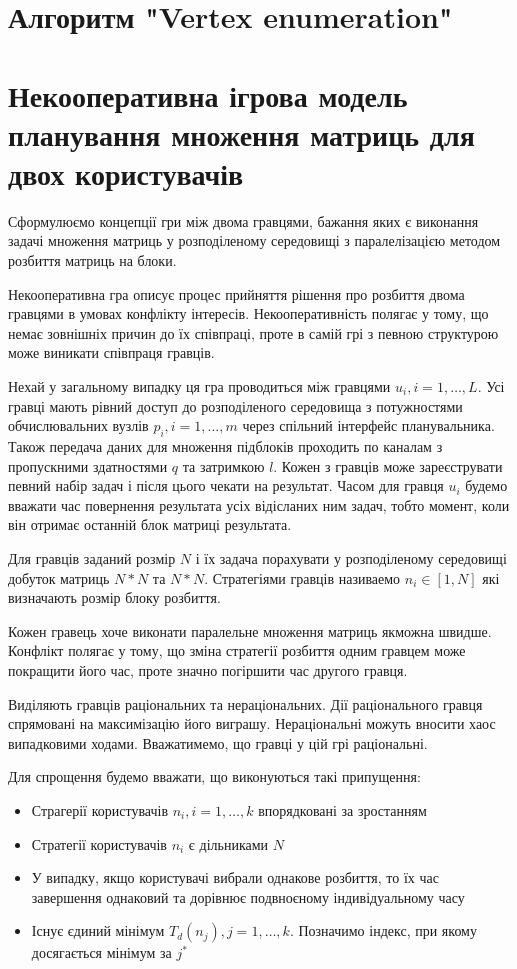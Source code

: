 \section{Алгоритм "Vertex enumeration"}


\section{Некооперативна ігрова модель планування множення матриць для двох користувачів}

Сформулюємо концепції гри між двома гравцями, бажання яких є виконання задачі множення матриць у розподіленому середовищі з паралелізацією методом розбиття матриць на блоки. 

Некооперативна гра описує процес прийняття рішення про розбиття двома гравцями в умовах конфлікту інтересів. Некооперативність полягає у тому, що немає зовнішніх причин до їх співпраці, проте в самій грі з певною структурою може виникати співпраця гравців.

Нехай у загальному випадку ця гра проводиться між гравцями ${u_i}, i=1,\ldots,L$. Усі гравці мають рівний доступ до розподіленого середовища з потужностями обчислювальних вузлів ${p_i}, i=1,\ldots,m$ через спільний інтерфейс планувальника. Також передача даних для множення підблоків проходить по каналам з пропускними здатностями $q$ та затримкою $l$. Кожен з гравців може зареєструвати певний набір задач і після цього чекати на результат. Часом для гравця $u_i$ будемо вважати час повернення результата усіх відісланих ним задач, тобто момент, коли він отримає останній блок матриці результата.

Для гравців заданий розмір $N$ і їх задача порахувати у розподіленому середовищі добуток матриць $N*N$ та $N*N$. Стратегіями гравців називаемо $n_i \in [1,N]$ які визначають розмір блоку розбиття.

Кожен гравець хоче виконати паралельне множення матриць якможна швидше. Конфлікт полягає у тому, що зміна стратегії розбиття одним гравцем може покращити його час, проте значно погіршити час другого гравця.

Виділяють гравців раціональних та нераціональних. Дії раціонального гравця спрямовані на максимізацію його виграшу. Нераціональні можуть вносити хаос випадковими ходами. Вважатимемо, що гравці у цій грі раціональні.

Для спрощення будемо вважати, що виконуються такі припущення:
\begin{itemize}
	\item Страгерії користувачів $n_i, i=1,\ldots,k$ впорядковані за зростанням
	\item Стратегії користувачів $n_i$ є дільниками $N$
	\item У випадку, якщо користувачі вибрали однакове розбиття, то їх час завершення однаковий та дорівнює подвноєному індивідуальному часу
	\item Існує єдиний мінімум $T_d(n_j), j=1,\ldots,k$. Позначимо індекс, при якому досягається мінімум за $j^*$
\end{itemize}

